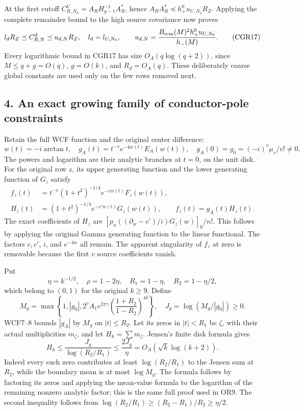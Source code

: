 At the first cutoff \(C_{R,N_0}^U=A_RH_{g-1}^{-1}A_R^*\), hence \(A_RA_R^*\preceq h_+^0u_{U,N_0}R_Z\). Applying the complete remainder bound to the high source covariance now proves \[
l_dR_Z\preceq C_{R,N}^d\preceq u_{d,N}R_Z,
\quad l_d=l_{U,N_0},\qquad
u_{d,N}=\frac{B_{\rm rem}(M)^2h_+^0u_{U,N_0}}{h_-(M)}.
\tag{CGR17}
\] Every logarithmic bound in CGR17 has size \(O_A(q\log(q+2))\), since \(M\le q+g=O(q)\), \(g=O(k)\), and \(R_d=O_A(q)\). These deliberately coarse global constants are used only on the few rows removed next.

\subsection{4. An exact growing family of conductor-pole constraints}\label{an-exact-growing-family-of-conductor-pole-constraints}

Retain the full WCF function and the original center difference: \[
w(t)=-i\arctan t,\quad
g_A(t)=t^{-v}e^{-4w(t)}E_A(w(t)),\quad
g_A(0)=g_0=(-i)^v\mu_v/v!\ne0.
\tag{CGR18}
\] The powers and logarithm are their analytic branches at \(t=0\), on the unit disk. For the original row \(z\), its upper generating function and the lower generating function of \(G_z\) satisfy \[
\begin{split}
f_z(t)&=t^{-v}(1+t^2)^{-1/4}e^{-cw(t)}F_z(w(t)),\\
H_z(t)&=(1+t^2)^{-1/4}e^{-c'w(t)}G_z(w(t)),\qquad
f_z(t)=g_A(t)H_z(t).
\end{split}\tag{CGR19}
\] The exact coefficients of \(H_z\) are \([p_n((\partial_w-c')/i)G_z(w)]_0/n!\). This follows by applying the original Gamma generating function to the linear functional. The factors \(c,c'\), \(i\), and \(e^{-4w}\) all remain. The apparent singularity of \(f_z\) at zero is removable because the first \(v\) source coefficients vanish.

Put \[
\eta=k^{-1/2},\quad \rho=1-2\eta,\quad
R_1=1-\eta,\quad R_2=1-\eta/2,
\tag{CGR20}
\] which belong to \((0,1)\) for the original \(k\ge9\). Define \[
M_g=\max\left\{1,|g_0|,
2^vA_1e^{2\pi\gamma}
\left(\frac{1+R_2}{1-R_2}\right)^{4\delta}\right\},
\quad J_g=\log(M_g/|g_0|)\ge0.
\tag{CGR21}
\] WCF7--8 bounds \(|g_A|\) by \(M_g\) on \(|t|\le R_2\). Let its zeros in \(|t|<R_1\) be \(\zeta\), with their actual multiplicities \(m_\zeta\), and let \(H_k=\sum m_\zeta\). Jensen's finite disk formula gives \[
H_k\le\frac{J_g}{\log(R_2/R_1)}\le\frac{2J_g}{\eta}
=O_A(\sqrt{k}\log(k+2)).
\tag{CGR22}
\] Indeed every such zero contributes at least \(\log(R_2/R_1)\) to the Jensen sum at \(R_2\), while the boundary mean is at most \(\log M_g\). The formula follows by factoring its zeros and applying the mean-value formula to the logarithm of the remaining nonzero analytic factor; this is the same full proof used in OR9. The second inequality follows from \(\log(R_2/R_1)\ge(R_2-R_1)/R_2\ge\eta/2\).

